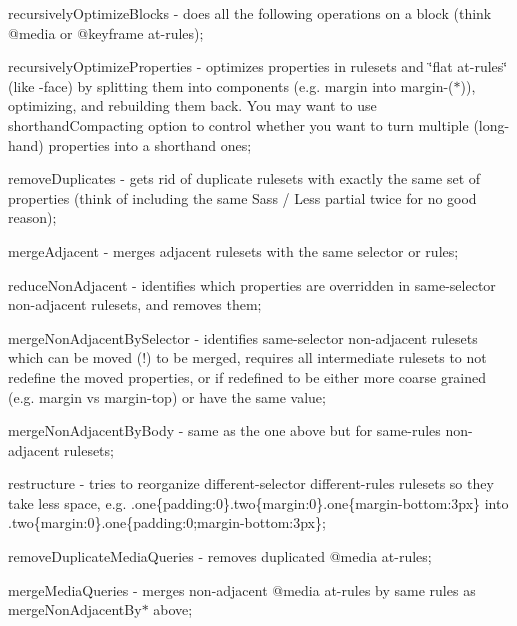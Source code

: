 \begin{DoxyItemize}
\item {\ttfamily recursively\+Optimize\+Blocks} -\/ does all the following operations on a block (think {\ttfamily @media} or {\ttfamily @keyframe} at-\/rules);
\item {\ttfamily recursively\+Optimize\+Properties} -\/ optimizes properties in rulesets and \char`\"{}flat at-\/rules\char`\"{} (like -\/face) by splitting them into components (e.\+g. {\ttfamily margin} into {\ttfamily margin-\/($\ast$)}), optimizing, and rebuilding them back. You may want to use {\ttfamily shorthand\+Compacting} option to control whether you want to turn multiple (long-\/hand) properties into a shorthand ones;
\item {\ttfamily remove\+Duplicates} -\/ gets rid of duplicate rulesets with exactly the same set of properties (think of including the same Sass / Less partial twice for no good reason);
\item {\ttfamily merge\+Adjacent} -\/ merges adjacent rulesets with the same selector or rules;
\item {\ttfamily reduce\+Non\+Adjacent} -\/ identifies which properties are overridden in same-\/selector non-\/adjacent rulesets, and removes them;
\item {\ttfamily merge\+Non\+Adjacent\+By\+Selector} -\/ identifies same-\/selector non-\/adjacent rulesets which can be moved (!) to be merged, requires all intermediate rulesets to not redefine the moved properties, or if redefined to be either more coarse grained (e.\+g. {\ttfamily margin} vs {\ttfamily margin-\/top}) or have the same value;
\item {\ttfamily merge\+Non\+Adjacent\+By\+Body} -\/ same as the one above but for same-\/rules non-\/adjacent rulesets;
\item {\ttfamily restructure} -\/ tries to reorganize different-\/selector different-\/rules rulesets so they take less space, e.\+g. {\ttfamily .one\{padding\+:0\}.two\{margin\+:0\}.one\{margin-\/bottom\+:3px\}} into {\ttfamily .two\{margin\+:0\}.one\{padding\+:0;margin-\/bottom\+:3px\}};
\item {\ttfamily remove\+Duplicate\+Media\+Queries} -\/ removes duplicated {\ttfamily @media} at-\/rules;
\item {\ttfamily merge\+Media\+Queries} -\/ merges non-\/adjacent {\ttfamily @media} at-\/rules by same rules as {\ttfamily merge\+Non\+Adjacent\+By$\ast$} above;
\end{DoxyItemize}

